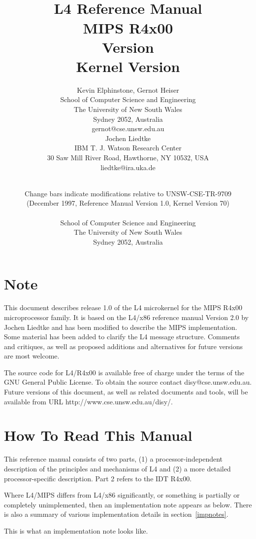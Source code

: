\documentclass[a4paper,11pt,twoside,dvips]{book}
\title{~\\[-20mm] \Huge L4 Reference Manual\\[20pt] 
       MIPS R4x00\\[20pt] 
       {\LARGE Version \RCSRevision \\
         Kernel Version }}
\author{Kevin Elphinstone, Gernot Heiser\\
       {\normalsize School of Computer Science and Engineering}\\
       {\normalsize The University of New South Wales}\\ 
       {\normalsize Sydney 2052, Australia}\\ 
       {\normalsize gernot@cse.unsw.edu.au} \\[20pt]
       Jochen Liedtke\\
       {\normalsize IBM T. J. Watson Research Center}\\ 
       {\normalsize 30 Saw Mill River Road, Hawthorne, NY 10532, USA}\\ 
       {\normalsize liedtke@ira.uka.de} \\[20pt]
       }
\date{\RCSDate\\ Change bars indicate modifications relative to
       UNSW-CSE-TR-9709\\ (December
        1997, Reference Manual Version 1.0, Kernel Version 70)\\ \vfill\sf
	\epsfig{file=l4uman/eps/unicrest-screen.eps,height=25mm}\\[2ex]
	School of Computer Science and Engineering\\
	The University of New South Wales\\
	Sydney 2052, Australia \vspace{-10mm}}
\newcommand{\Tilde}{\raisebox{-0.6ex}{\~{}}}
\newcommand{\impnote}[1]{\framebox{\textbf{MIPS Implementation Note:}} #1}
\begin{document}
 
\setcounter{page}{1} 
 
 
\pagestyle{empty}
\thispagestyle{empty} 
\setcounter{page}{1} 
 
 
\maketitle

\pagestyle{headings}
\thispagestyle{empty} 
 
 
\mbox{} 
\clearpage 
\thispagestyle{headings} 
\setcounter{page}{3} 
 
\section*{Note} 

This document describes release 1.0 of the L4 microkernel for the MIPS
R4x00 microprocessor family. It is based on the L4/x86 reference manual
Version 2.0 by Jochen Liedtke and has been modified to describe the MIPS
implementation. Some material has been added to clarify the L4 message
structure. Comments and critiques, as well as proposed additions and
alternatives for future versions are most welcome.

The source code for L4/R4x00 is available
free of charge under the terms of the GNU General Public License. To
obtain the source contact \textsf{disy@cse.unsw.edu.au}. Future versions
of this document, as well as related documents and tools, will be
available from URL \textsf{http://www.cse.unsw.edu.au/{\Tilde}disy/}.
 
\vspace{\fill} 
 
\section*{How To Read This Manual} 
 
 
This reference manual consists of two parts, (1) a processor-independent
description of the principles and mechanisms of L4 and (2) a more detailed
processor-specific description. Part 2 refers to the IDT R4x00. 

Where L4/MIPS differs from L4/x86 significantly, or something is
partially or completely unimplemented, then an implementation note
appears as below. There is also a summary of various implementation
details in section~\ref{impnotes}.


\impnote{This is what an implementation note looks like.}  

\vspace{\fill} 
 
\end{document}
